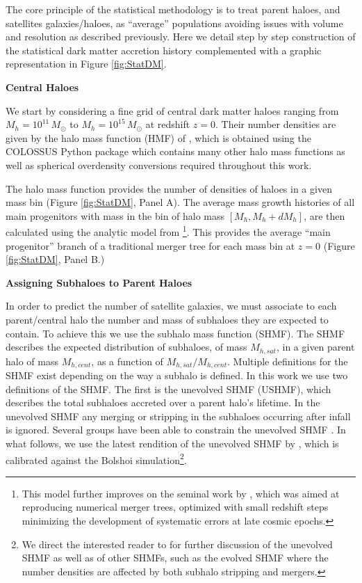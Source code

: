 The core principle of the statistical methodology is to treat parent haloes, and satellites galaxies/haloes, as ``average'' populations avoiding issues with volume and resolution as described previously. Here we detail step by step construction of the statistical dark matter accretion history complemented with a graphic representation in Figure \ref{fig:StatDM}.

\textbf{Central Haloes}

We start by considering a fine grid of central dark matter haloes ranging from $M_{h}=10^{11}\, M_{\odot}$ to $M_{h}=10^{15}\, M_{\odot}$ at redshift $z=0$. Their number densities are given by the halo mass function (HMF) of \citet{Despali2016TheDefinitions}, which is obtained using the COLOSSUS Python package \citep{Diemer2017COLOSSUS:Halos} which contains many other halo mass functions as well as spherical overdensity conversions required throughout this work. 

The halo mass function provides the number of densities of haloes in a given mass bin (Figure \ref{fig:StatDM}, Panel A).
The average mass growth histories of all main progenitors with mass in the bin of halo mass $[M_{h},M_{h}+dM_{h}]$, are then calculated using the analytic model from \cite{vandenBosch2014ComingWells}\footnote{This model further improves on the seminal work by \citet{Parkinson2008GeneratingTrees}, which was aimed at reproducing numerical merger trees, optimized with small redshift steps minimizing the development of systematic errors at late cosmic epochs.}. This provides the average ``main progenitor'' branch of a traditional merger tree for each mass bin at $z = 0$ (Figure \ref{fig:StatDM}, Panel B.)

\textbf{Assigning Subhaloes to Parent Haloes}

In order to predict the number of satellite galaxies, we must associate to each parent/central halo the number and mass of subhaloes they are expected to contain. To achieve this we use the subhalo mass function (SHMF). The SHMF describes the expected distribution of subhaloes, of mass $M_{h,sat}$, in a given parent halo of mass $M_{h,cent}$, as a function of $M_{h,sat}/M_{h,cent}$. Multiple definitions for the SHMF exist depending on the way a subhalo is defined. In this work we use two definitions of the SHMF. The first is the unevolved SHMF (USHMF), which describes the total subhaloes accreted over a parent halo's lifetime. In the unevolved SHMF any merging or stripping in the subhaloes occurring after infall is ignored. Several groups have been able to constrain the unevolved SHMF \citep{Giocoli2008AnalyticalHaloes,Jiang2016StatisticsFunctions}. In what follows, we use the latest rendition of the unevolved SHMF by \citet{Jiang2016StatisticsFunctions}, which is calibrated against the Bolshoi simulation\footnote{ We direct the interested reader to \citet{Jiang2016StatisticsFunctions} for further discussion of the unevolved SHMF as well as of other SHMFs, such as the evolved SHMF where the number densities are affected by both subhalo stripping and mergers.}.


